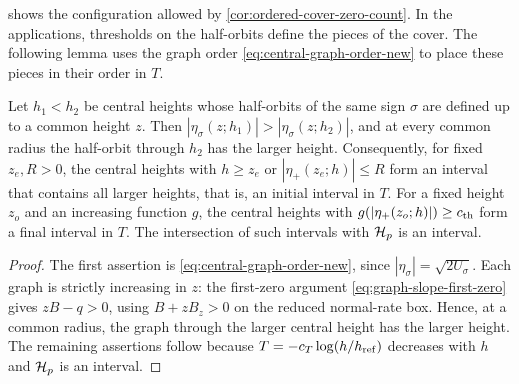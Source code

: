 

 shows the configuration allowed by
\cref{cor:ordered-cover-zero-count}. In the applications, thresholds
on the half-orbits define the pieces of the cover. The following
lemma uses the graph order \eqref{eq:central-graph-order-new} to
place these pieces in their order in \(T\).

\begin{lemma}
\label{lem:central-height-order}
Let \(h_1<h_2\) be central heights whose half-orbits of the same sign
\(\sigma\) are defined up to a common height \(z\). Then
\(|\eta_\sigma(z;h_1)|>|\eta_\sigma(z;h_2)|\), and at every common radius
the half-orbit through \(h_2\) has the larger height. Consequently, for
fixed \(z_e,R>0\), the central heights with \(h\ge z_e\) or
\(|\eta_+(z_e;h)|\le R\) form an interval that contains all larger
heights, that is, an initial interval in \(T\). For a fixed height
\(z_o\) and an increasing function \(g\), the central heights with
\(g(|\eta_+(z_o;h)|)\ge c_{\rm th}\) form a final interval in \(T\). The
intersection of such intervals with \(\mathcal H_p\) is an interval.
\end{lemma}

\begin{proof}
The first assertion is \eqref{eq:central-graph-order-new}, since
\(|\eta_\sigma|=\sqrt{2U_\sigma}\). Each graph is strictly increasing in
\(z\): the first-zero argument \eqref{eq:graph-slope-first-zero}
gives \(zB-q>0\), using \(B+zB_z>0\) on the reduced normal-rate box.
Hence, at a common radius, the graph through the larger central
height has the larger height. The remaining assertions follow because
\(T=-c_T\log(h/h_{\rm ref})\) decreases with \(h\) and
\(\mathcal H_p\) is an interval.
\end{proof}

